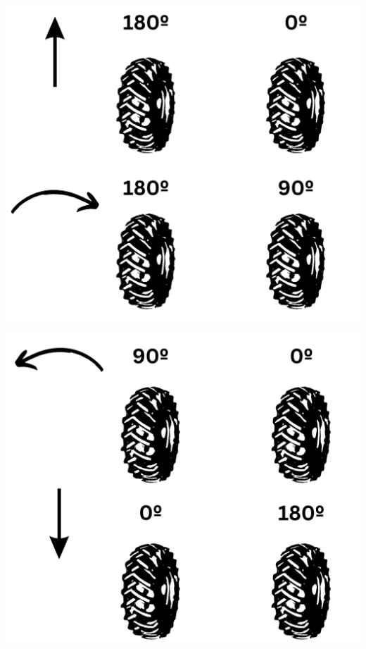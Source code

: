 \documentclass{beamer}
\begin{document}
\begin{frame}
	\begin{minipage}{0.3\textwidth}
		\centering
		\includegraphics[width=\textwidth]{figs/motorlogic1.png}
	\end{minipage}
	\begin{minipage}{0.3\textwidth}
		\centering
		\includegraphics[width=\textwidth]{figs/motorlogic2.png}
	\end{minipage}
	
\end{frame}
\end{document}
